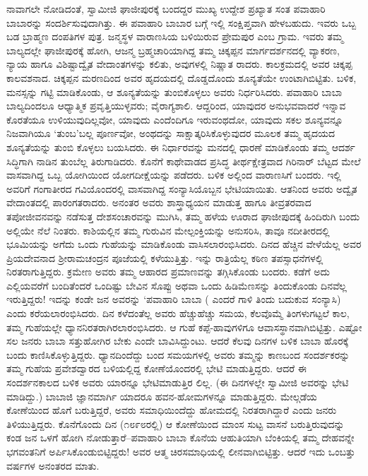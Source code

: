 ನಾವಾಗಲೇ ನೋಡಿದಂತೆ, ಸ್ವಾಮೀಜಿ ಘಾಜೀಪುರಕ್ಕೆ ಬಂದದ್ದರ ಮುಖ್ಯ ಉದ್ದೇಶ ಪ್ರಖ್ಯಾತ ಸಂತ ಪವಾಹಾರಿ ಬಾಬಾರನ್ನು ಸಂದರ್ಶಿಸುವುದಾಗಿತ್ತು. ಈ ಪವಾಹಾರಿ ಬಾಬಾರ ಬಗ್ಗೆ ಇಲ್ಲಿ ಸಂಕ್ಷಿಪ್ತವಾಗಿ ಹೇಳಬಹುದು. ಇವರು ಒಬ್ಬ ಬಡ ಬ್ರಾಹ್ಮಣ ದಂಪತಿಗಳ ಪುತ್ರ. ಜನ್ಮಸ್ಥಳ ವಾರಾಣಸಿಯ ಬಳಿಯಿರುವ ಪ್ರೇಮಪುರ ಎಂಬ ಗ್ರಾಮ. ಇವರು ತಮ್ಮ ಬಾಲ್ಯದಲ್ಲೇ ಘಾಜೀಪುರಕ್ಕೆ ಹೋಗಿ, ಆಜನ್ಮ ಬ್ರಹ್ಮಚಾರಿಯಾಗಿದ್ದ ತಮ್ಮ ಚಿಕ್ಕಪ್ಪನ ಮಾರ್ಗದರ್ಶನದಲ್ಲಿ ವ್ಯಾಕರಣ, ನ್ಯಾಯ ಹಾಗೂ ವಿಶಿಷ್ಟಾದ್ವೈತ ವೇದಾಂತಗಳನ್ನು ಕಲಿತು, ಅವುಗಳಲ್ಲಿ ನಿಷ್ಣಾತ ರಾದರು. ಕಾಲಕ್ರಮದಲ್ಲಿ ಅವರ ಚಿಕ್ಕಪ್ಪ ಕಾಲವಶನಾದ. ಚಿಕ್ಕಪ್ಪನ ಮರಣದಿಂದ ಅವರ ಹೃದಯದಲ್ಲಿ ದೊಡ್ಡದೊಂದು ಶೂನ್ಯತೆಯೇ ಉಂಟಾಗಿಬಿಟ್ಟಿತು. ಬಳಿಕ, ಮನಸ್ಸನ್ನು ಗಟ್ಟಿ ಮಾಡಿಕೊಂಡು, ಆ ಶೂನ್ಯತೆಯನ್ನು ತುಂಬಿಕೊಳ್ಳಲು ಅವರು ನಿರ್ಧರಿಸಿದರು. ಪವಾಹಾರಿ ಬಾಬಾ ಬಾಲ್ಯದಿಂದಲೂ ಆಧ್ಯಾತ್ಮಿಕ ಪ್ರವೃತ್ತಿಯುಳ್ಳವರು; ವೈರಾಗ್ಯಶಾಲಿ. ಆದ್ದರಿಂದ, ಯಾವುದರ ಅನುಭವವಾದರೆ ಇನ್ನಾವ ಕೊರತೆಯೂ ಉಳಿಯುವುದಿಲ್ಲವೋ, ಯಾವುದು ಎಂದೆಂದಿಗೂ ಇರುವಂಥದೋ, ಯಾವುದು ಸಕಲ ಶೂನ್ಯವನ್ನೂ ನಿಜವಾಗಿಯೂ ‘ತುಂಬ’ಬಲ್ಲ ಪೂರ್ಣವೋ, ಅಂಥದನ್ನು ಸಾಕ್ಷಾತ್ಕರಿಸಿಕೊಳ್ಳುವುದರ ಮೂಲಕ ತಮ್ಮ ಹೃದಯದ ಶೂನ್ಯತೆಯನ್ನು ತುಂಬಿ ಕೊಳ್ಳಲು ಬಯಸಿದರು. ಈ ನಿರ್ಧಾರವನ್ನು ಮನದಲ್ಲಿ ಧಾರಣೆ ಮಾಡಿಕೊಂಡು ತಮ್ಮ ಆದರ್ಶ ಸಿದ್ಧಿಗಾಗಿ ನಾಡಿನ ತುಂಬೆಲ್ಲ ತಿರುಗಾಡಿದರು. ಕೊನೆಗೆ ಕಾಥೇವಾಡದ ಪ್ರಸಿದ್ಧ ತೀರ್ಥಕ್ಷೇತ್ರವಾದ ಗಿರಿನಾರ್ ಬೆಟ್ಟದ ಮೇಲೆ ವಾಸವಾಗಿದ್ದ ಒಬ್ಬ ಯೋಗಿಯಿಂದ ಯೋಗದೀಕ್ಷೆಯನ್ನು ಪಡೆದರು. ಬಳಿಕ ಅಲ್ಲಿಂದ ವಾರಾಣಸಿಗೆ ಬಂದರು. ಇಲ್ಲಿ ಅವರಿಗೆ ಗಂಗಾತೀರದ ಗವಿಯೊಂದರಲ್ಲಿ ವಾಸವಾಗಿದ್ದ ಸಂನ್ಯಾಸಿಯೊಬ್ಬನ ಭೇಟಿಯಾಯಿತು. ಆತನಿಂದ ಅವರು ಅದ್ವೈತ ವೇದಾಂತದಲ್ಲಿ ಪಾರಂಗತರಾದರು. ಅನಂತರ ಅವರು ಶಾಸ್ತ್ರಾಧ್ಯಯನ ಮಾಡುತ್ತ ಹಾಗೂ ತೀವ್ರತರವಾದ ತಪೋಜೀವನವನ್ನು ನಡೆಸುತ್ತ ದೇಶಸಂಚಾರವನ್ನು ಮುಗಿಸಿ, ತಮ್ಮ ಹಳೆಯ ಊರಾದ ಘಾಜೀಪುದಕ್ಕೆ ಹಿಂದಿರುಗಿ ಬಂದು ಅಲ್ಲಿಯೇ ನೆಲೆ ನಿಂತರು. ಕಾಶಿಯಲ್ಲಿನ ತಮ್ಮ ಗುರುವಿನ ಮೇಲ್ಪಂಕ್ತಿಯನ್ನು ಅನುಸರಿಸಿ, ತಾವೂ ನದೀತೀರದಲ್ಲಿ ಭೂಮಿಯನ್ನು ಅಗೆದು ಒಂದು ಗುಹೆಯನ್ನು ಮಾಡಿಕೊಂಡು ವಾಸಿಸಲಾರಂಭಿಸಿದರು. ದಿನದ ಹೆಚ್ಚಿನ ವೇಳೆಯೆಲ್ಲ ಅವರ ಪ್ರಿಯದೇವನಾದ ಶ್ರೀರಾಮಚಂದ್ರನ ಪೂಜೆಯಲ್ಲಿ ಕಳೆಯುತ್ತಿತ್ತು. ಇನ್ನು ರಾತ್ರಿಯೆಲ್ಲ ಕಠಿಣ ತಪಸ್ಸಾಧನೆಗಳಲ್ಲಿ ನಿರತರಾಗುತ್ತಿದ್ದರು. ಕ್ರಮೇಣ ಅವರು ತಮ್ಮ ಆಹಾರದ ಪ್ರಮಾಣವನ್ನು ತಗ್ಗಿಸಿಕೊಂಡು ಬಂದರು. ಕಡೆಗೆ ಅದು ಎಲ್ಲಿಯವರೆಗೆ ಬಂದಿತೆಂದರೆ ಒಂದಿಷ್ಟು ಬೇವಿನ ಸೊಪ್ಪು ಅಥವಾ ಒಂದು ಹಿಡಿಮೆಣಸನ್ನು ತಿಂದುಕೊಂಡು ದಿನವೆಲ್ಲ ಇರುತ್ತಿದ್ದರು! ಇದನ್ನು ಕಂಡೇ ಜನ ಅವರನ್ನು ‘ಪವಾಹಾರಿ ಬಾಬಾ ( ಎಂದರೆ ಗಾಳಿ ತಿಂದು ಬದುಕುವ ಸಂನ್ಯಾಸಿ) ಎಂದು ಕರೆಯಲಾರಂಭಿಸಿದರು. ದಿನ ಕಳೆದಂತೆಲ್ಲ ಅವರು ಹೆಚ್ಚುಹೆಚ್ಚು ಸಮಯ, ಕೆಲವೊಮ್ಮೆ ತಿಂಗಳುಗಟ್ಟಲೆ ಕಾಲ, ತಮ್ಮ ಗುಹೆಯಲ್ಲೇ ಧ್ಯಾನನಿರತರಾಗಿರಲಾರಂಭಿಸಿದರು. ಆ ಗುಹೆ ಕಪ್ಪೆ-ಹಾವುಗಳಿಗೂ ಆವಾಸಸ್ಥಾನವಾಗಿಬಿಟ್ಟಿತ್ತು. ಎಷ್ಟೋ ಸಲ ಜನರು ಬಾಬಾ ಸತ್ತುಹೋಗಿರ ಬೇಕು ಎಂದೇ ಬಾವಿಸಿದ್ದುಂಟು. ಆದರೆ ಕೆಲವು ದಿನಗಳ ಬಳಿಕ ಬಾಬಾ ಹೊರಕ್ಕೆ ಬಂದು ಕಾಣಿಸಿಕೊಳ್ಳುತ್ತಿದ್ದರು. ಧ್ಯಾನದಿಂದೆದ್ದು ಬಂದ ಸಮಯಗಳಲ್ಲಿ ಅವರು ತಮ್ಮನ್ನು ಕಾಣಬಂದ ಸಂದರ್ಶಕರನ್ನು ತಮ್ಮ ಗುಹೆಯ ಪ್ರವೇಶದ್ವಾರದ ಬಳಿಯಲ್ಲಿದ್ದ ಕೋಣೆಯೊಂದರಲ್ಲಿ ಭೇಟಿ ಮಾಡುತ್ತಿದ್ದರು. ಆದರೆ ಈ ಸಂದರ್ಶನಕಾಲದ ಬಳಿಕ ಅವರು ಯಾರನ್ನೂ ಭೇಟಿಮಾಡುತ್ತಿರ ಲಿಲ್ಲ. (ಈ ದಿನಗಳಲ್ಲೇ ಸ್ವಾಮೀಜಿ ಅವರನ್ನು ಭೇಟಿ ಮಾಡಿದ್ದು.) ಬಾಬಾಜಿ ಜ್ಞಾನಮಾರ್ಗಿ ಯಾದರೂ ಹವನ-ಹೋಮಗಳನ್ನೂ ಮಾಡುತ್ತಿದ್ದರು. ಮೇಲ್ಗಡೆಯ ಕೋಣೆಯಿಂದ ಹೊಗೆ ಬರುತ್ತಿದ್ದರೆ, ಅವರು ಸಮಾಧಿಯಿಂದೆದ್ದು ಹೋಮದಲ್ಲಿ ನಿರತರಾಗಿದ್ದಾರೆ ಎಂದು ಜನರು ತಿಳಿಯುತ್ತಿದ್ದರು. ಕೊನೆಗೊಂದು ದಿನ (೧೮೯೮ರಲ್ಲಿ) ಆ ಕೋಣೆಯಿಂದ ಮಾಂಸ ಸುಟ್ಟ ವಾಸನೆ ಬರುತ್ತಿರುವುದನ್ನು ಕಂಡ ಜನ ಒಳಗೆ ಹೋಗಿ ನೋಡುತ್ತಾರೆ–ಪವಾಹಾರಿ ಬಾಬಾ ಕೊನೆಯ ಆಹುತಿಯಾಗಿ ಬೆಂಕಿಯಲ್ಲಿ ತಮ್ಮ ದೇಹವನ್ನೇ ಭಗವಂತನಿಗೆ ಅರ್ಪಿಸಿಕೊಂಡುಬಿಟ್ಟಿದ್ದರು! ಅವರ ಆತ್ಮ ಚಿರಸಮಾಧಿಯಲ್ಲಿ ಲೀನವಾಗಿಬಿಟ್ಟಿತ್ತು. ಆದರೆ ಇದು ಒಂಬತ್ತು ವರ್ಷಗಳ ಅನಂತರದ ಮಾತು.

